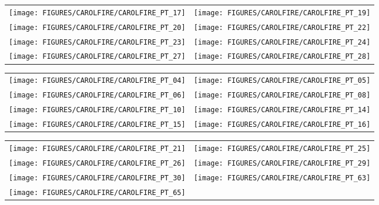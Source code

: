 \begin{figure}[p]
\begin{tabular*}{\textwidth}{l@{\extracolsep{\fill}}r}
\texttt{[image: FIGURES/CAROLFIRE/CAROLFIRE\_PT\_17]} &
\texttt{[image: FIGURES/CAROLFIRE/CAROLFIRE\_PT\_19]} \\
\texttt{[image: FIGURES/CAROLFIRE/CAROLFIRE\_PT\_20]} &
\texttt{[image: FIGURES/CAROLFIRE/CAROLFIRE\_PT\_22]} \\
\texttt{[image: FIGURES/CAROLFIRE/CAROLFIRE\_PT\_23]} &
\texttt{[image: FIGURES/CAROLFIRE/CAROLFIRE\_PT\_24]} \\
\texttt{[image: FIGURES/CAROLFIRE/CAROLFIRE\_PT\_27]} &
\texttt{[image: FIGURES/CAROLFIRE/CAROLFIRE\_PT\_28]}
\end{tabular*}
\label{CAROLFIRE_Thermoset_2}
\end{figure}

\begin{figure}[p]
\begin{tabular*}{\textwidth}{l@{\extracolsep{\fill}}r}
\texttt{[image: FIGURES/CAROLFIRE/CAROLFIRE\_PT\_04]} &
\texttt{[image: FIGURES/CAROLFIRE/CAROLFIRE\_PT\_05]} \\
\texttt{[image: FIGURES/CAROLFIRE/CAROLFIRE\_PT\_06]} &
\texttt{[image: FIGURES/CAROLFIRE/CAROLFIRE\_PT\_08]} \\
\texttt{[image: FIGURES/CAROLFIRE/CAROLFIRE\_PT\_10]} &
\texttt{[image: FIGURES/CAROLFIRE/CAROLFIRE\_PT\_14]} \\
\texttt{[image: FIGURES/CAROLFIRE/CAROLFIRE\_PT\_15]} &
\texttt{[image: FIGURES/CAROLFIRE/CAROLFIRE\_PT\_16]}
\end{tabular*}
\label{CAROLFIRE_Thermoplastic_1}
\end{figure}

\begin{figure}[p]
\begin{tabular*}{\textwidth}{l@{\extracolsep{\fill}}r}
\texttt{[image: FIGURES/CAROLFIRE/CAROLFIRE\_PT\_21]} &
\texttt{[image: FIGURES/CAROLFIRE/CAROLFIRE\_PT\_25]} \\
\texttt{[image: FIGURES/CAROLFIRE/CAROLFIRE\_PT\_26]} &
\texttt{[image: FIGURES/CAROLFIRE/CAROLFIRE\_PT\_29]} \\
\texttt{[image: FIGURES/CAROLFIRE/CAROLFIRE\_PT\_30]} &
\texttt{[image: FIGURES/CAROLFIRE/CAROLFIRE\_PT\_63]} \\
\texttt{[image: FIGURES/CAROLFIRE/CAROLFIRE\_PT\_65]}
\end{tabular*}
\label{CAROLFIRE_Thermoplastic_2}
\end{figure}

